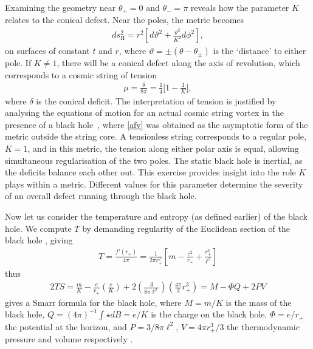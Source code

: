 \documentclass[
twoside,
openright,
frontopenright,
]{dmathesis}
\begin{document}
Examining the geometry near $\theta_+ = 0$ and $\theta_- = \pi$ reveals how the
parameter $K$ relates to the conical defect. Near the poles, the metric becomes
\begin{align}
ds_{\mathrm{II}}^2 = r^2 \left[ d\vartheta^2 + \frac{\vartheta^2}{K^2} d\phi^2\right],
\end{align}
on surfaces of constant $t$ and $r$, where
$\vartheta = \pm (\theta - \theta_\pm)$ is the `distance' to either pole. If
$K\neq 1$, there will be a conical defect along the axis of revolution, which
corresponds to a cosmic string of tension
\begin{align}
\mu = \frac{\delta}{8\pi} = \frac14 \bigg[1-\frac{1}{K}\bigg],
\label{afvtension}
\end{align}
where $\delta$ is the conical deficit. The interpretation of tension is
justified by analysing the equations of motion for an actual cosmic string
vortex in the presence of a black hole~\cite{Achucarro:1995nu}, where
\eqref{afv} was obtained as the asymptotic form of the metric outside the string
core.  A tensionless string corresponds to a regular pole, $K=1$, and in this
metric, the tension along either polar axis is equal, allowing simultaneous
regularisation of the two poles. The static black hole is inertial, as the
deficits balance each other out. This exercise provides insight into the role
$K$ plays within a metric. Different values for this parameter determine the
severity of an overall defect running through the black hole.

Now let us consider the temperature and entropy (as defined earlier) of the
black hole. We compute $T$ by demanding regularity of the Euclidean section of
the black hole \cite{Gibbons:1976ue}, giving
\begin{align}
T = \frac{f'(r_+)}{4\pi} = \frac{1}{2\pi r_+^2} \left [
m - \frac{e^2}{r_+} + \frac{r_+^3}{\ell^2}\right]
\end{align}
thus 
\begin{align}
2TS = \frac{m}{K} - \frac{e}{r_+}\left (\frac{e}{K} \right ) 
+ 2\left (\frac{3}{8\pi \ell^2} \right ) \left (\frac{4\pi}{3} r_+^3\right ) 
= M - \Phi Q + 2PV
\end{align}
gives a Smarr formula \cite{Smarr:1972kt} for the black hole, where $M=m/K$ is
the mass of the black hole, $Q = (4\pi)^{-1}
\int \star dB=e/K$ is the charge on the black hole, 
$\Phi = e/r_+$ the potential at the horizon, and $P = 3/8\pi \ell^2$, 
$V = 4\pi r_+^3/3$ the thermodynamic pressure and volume respectively 
\cite{Teitelboim:1985dp,Kastor:2009wy,Dolan:2011xt}.
\end{document}
